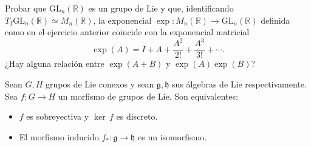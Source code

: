 \documentclass[12pt, a4paper]{amsart}
\theoremstyle{definition}
\newcommand{\RR}{\mathbb{R}}      %
\begin{document}
\begin{question}
Probar que $\mathrm{GL}_n(\RR)$ es un grupo de Lie y que, identificando $T_I\mathrm{GL}_n(\RR)\simeq M_n(\RR)$, la exponencial $\exp:M_n(\RR)\to\mathrm{GL}_n(\RR)$ definida como en el ejercicio anterior coincide con la exponencial matricial $$\exp(A) = I+A + \dfrac{A^2}{2!}+\dfrac{A^3}{3!} + \cdots.$$ ¿Hay alguna relación entre $\exp(A+B)$ y $\exp(A)\exp(B)$?
\end{question}

\begin{question}
Sean $G,H$ grupos de Lie conexos y sean $\mathfrak{g},\mathfrak{h}$ sus álgebras de Lie respectivamente. Sea $f:G\to H$ un morfismo de grupos de Lie. Son equivalentes:
\begin{itemize}
\item $f$ es sobreyectiva y $\ker\, f$ es discreto.
\item El morfismo inducido $f_*:\mathfrak{g}\to\mathfrak{h}$ es un isomorfismo.
\end{itemize}
\end{question}
\end{document}
